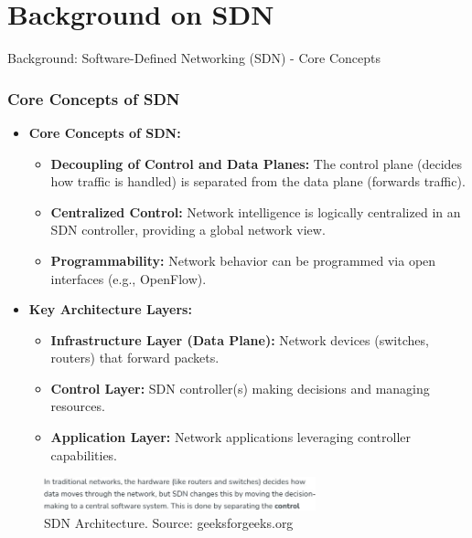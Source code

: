 \documentclass{beamer}
\begin{document}
\section{Background on SDN}

\begin{frame}{Background: Software-Defined Networking (SDN) - Core Concepts}
  \frametitle{Core Concepts of SDN}
  \begin{itemize}
    \item \textbf{Core Concepts of SDN:}
    \begin{itemize}
        \item \textbf{Decoupling of Control and Data Planes:} The control plane (decides how traffic is handled) is separated from the data plane (forwards traffic).
        \item \textbf{Centralized Control:} Network intelligence is logically centralized in an SDN controller, providing a global network view.
        \item \textbf{Programmability:} Network behavior can be programmed via open interfaces (e.g., OpenFlow).
    \end{itemize}
    \item \textbf{Key Architecture Layers:}
    \begin{itemize}
        \item \textbf{Infrastructure Layer (Data Plane):} Network devices (switches, routers) that forward packets.
        \item \textbf{Control Layer:} SDN controller(s) making decisions and managing resources.
        \item \textbf{Application Layer:} Network applications leveraging controller capabilities.
    \end{itemize}
  \end{itemize}
  \begin{figure}
    \centering
    \includegraphics[width=0.7\textwidth]{figures/geeksforgeeks_sdn_architecture.png}
    \caption{SDN Architecture. Source: geeksforgeeks.org}
  \end{figure}
\end{frame}
\end{document}
